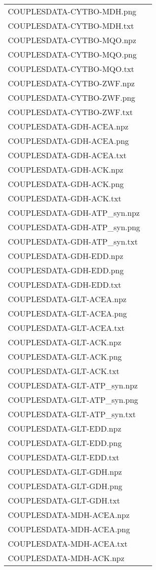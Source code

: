 \documentclass[a4paper, parskip=full]{scrreprt}
\begin{document}
\begin{longtable}{ll}
COUPLESDATA-CYTBO-MDH.png\\
COUPLESDATA-CYTBO-MDH.txt\\
COUPLESDATA-CYTBO-MQO.npz\\
COUPLESDATA-CYTBO-MQO.png\\
COUPLESDATA-CYTBO-MQO.txt\\
COUPLESDATA-CYTBO-ZWF.npz\\
COUPLESDATA-CYTBO-ZWF.png\\
COUPLESDATA-CYTBO-ZWF.txt\\
COUPLESDATA-GDH-ACEA.npz\\
COUPLESDATA-GDH-ACEA.png\\
COUPLESDATA-GDH-ACEA.txt\\
COUPLESDATA-GDH-ACK.npz\\
COUPLESDATA-GDH-ACK.png\\
COUPLESDATA-GDH-ACK.txt\\
COUPLESDATA-GDH-ATP\_syn.npz\\
COUPLESDATA-GDH-ATP\_syn.png\\
COUPLESDATA-GDH-ATP\_syn.txt\\
COUPLESDATA-GDH-EDD.npz\\
COUPLESDATA-GDH-EDD.png\\
COUPLESDATA-GDH-EDD.txt\\
COUPLESDATA-GLT-ACEA.npz\\
COUPLESDATA-GLT-ACEA.png\\
COUPLESDATA-GLT-ACEA.txt\\
COUPLESDATA-GLT-ACK.npz\\
COUPLESDATA-GLT-ACK.png\\
COUPLESDATA-GLT-ACK.txt\\
COUPLESDATA-GLT-ATP\_syn.npz\\
COUPLESDATA-GLT-ATP\_syn.png\\
COUPLESDATA-GLT-ATP\_syn.txt\\
COUPLESDATA-GLT-EDD.npz\\
COUPLESDATA-GLT-EDD.png\\
COUPLESDATA-GLT-EDD.txt\\
COUPLESDATA-GLT-GDH.npz\\
COUPLESDATA-GLT-GDH.png\\
COUPLESDATA-GLT-GDH.txt\\
COUPLESDATA-MDH-ACEA.npz\\
COUPLESDATA-MDH-ACEA.png\\
COUPLESDATA-MDH-ACEA.txt\\
COUPLESDATA-MDH-ACK.npz\\

\end{longtable}
\end{document}
